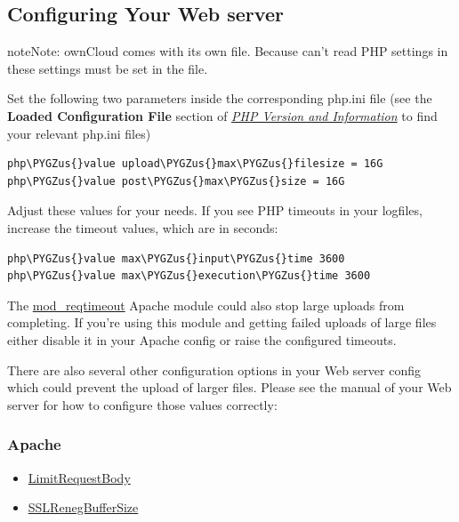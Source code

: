 \documentclass[letterpaper,10pt,english]{sphinxmanual}
\def\PYGZus{\char`\_}
\begin{document}
\subsection{Configuring Your Web server}
\label{configuration_files/big_file_upload_configuration:configuring-your-web-server}
\begin{notice}{note}{Note:}
ownCloud comes with its own  file. Because 
can't read PHP settings in  these settings must be set in the
 file.
\end{notice}

Set the following two parameters inside the corresponding php.ini file (see the
\textbf{Loaded Configuration File} section of {\hyperref[issues/general_troubleshooting:label\string-phpinfo]{\emph{PHP Version and Information}}} to find your
relevant php.ini files)

\begin{Verbatim}[commandchars=\\\{\}]
php\PYGZus{}value upload\PYGZus{}max\PYGZus{}filesize = 16G
php\PYGZus{}value post\PYGZus{}max\PYGZus{}size = 16G
\end{Verbatim}

Adjust these values for your needs. If you see PHP timeouts in your logfiles,
increase the timeout values, which are in seconds:

\begin{Verbatim}[commandchars=\\\{\}]
php\PYGZus{}value max\PYGZus{}input\PYGZus{}time 3600
php\PYGZus{}value max\PYGZus{}execution\PYGZus{}time 3600
\end{Verbatim}

The \href{https://httpd.apache.org/docs/current/mod/mod\_reqtimeout.html}{mod\_reqtimeout}
Apache module could also stop large uploads from completing. If you're using this
module and getting failed uploads of large files either disable it in your Apache
config or raise the configured  timeouts.

There are also several other configuration options in your Web server config which
could prevent the upload of larger files. Please see the manual of your Web server
for how to configure those values correctly:


\subsubsection{Apache}
\label{configuration_files/big_file_upload_configuration:apache}\begin{itemize}
\item {} 
\href{https://httpd.apache.org/docs/current/en/mod/core.html\#limitrequestbody}{LimitRequestBody}

\item {} 
\href{https://httpd.apache.org/docs/current/mod/mod\_ssl.html\#sslrenegbuffersize}{SSLRenegBufferSize}

\end{itemize}
\end{document}
